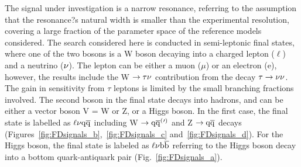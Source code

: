 \begin{table}[!htb]
\centering
\caption{Summary of the properties of the heavy resonance models considered in this work. The polarization of the produced W/Z boson in all considered models is mostly longitudinal.}
\label{tab:models}
\end{table}

The signal under investigation is a narrow resonance, referring to the assumption that the resonance?s natural width
is smaller than the experimental resolution, covering a large fraction of the parameter space of the reference models considered. 
The search considered here is conducted in semi-leptonic final states, where one of the two bosons is a W boson
decaying into a charged lepton ($\ell$) and a neutrino ($\nu$).
The lepton can be either a muon ($\mu$) or an electron (e), however, the results include the W $\rightarrow\tau\nu$ contribution from the decay $\tau\rightarrow\nu\nu$.
The gain in sensitivity from $\tau$ leptons is limited by the small branching fractions involved.
The second boson in the final state decays into hadrons, and can be either a vector boson V = W or Z,
or a Higgs boson. In the first case, the final state is labelled as $\ell\nu\mathrm{q}\overline{\mathrm{q}}$ including W $\rightarrow\mathrm{q}\overline{\mathrm{q}}^({}'^){}$ and Z $\rightarrow\mathrm{q}\overline{\mathrm{q}}$ decays (Figures~\ref{fig:FDsignals_b},~\ref{fig:FDsignals_c} and~\ref{fig:FDsignals_d}).
For the Higgs boson, the final state is labeled as $\ell\nu{\mathrm{b}\overline{\mathrm{b}}}$ referring to the Higgs boson decay into a bottom quark-antiquark pair (Fig.~\ref{fig:FDsignals_a}).

